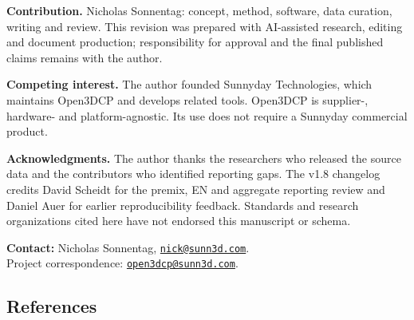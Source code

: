 \documentclass[
  american,
  11pt,
  letterpaper,
]{article}
\begin{document}
\textbf{Contribution.} Nicholas Sonnentag: concept, method, software,
data curation, writing and review. This revision was prepared with
AI-assisted research, editing and document production; responsibility
for approval and the final published claims remains with the author.

\textbf{Competing interest.} The author founded Sunnyday Technologies,
which maintains Open3DCP and develops related tools. Open3DCP is
supplier-, hardware- and platform-agnostic. Its use does not require a
Sunnyday commercial product.

\textbf{Acknowledgments.} The author thanks the researchers who released
the source data and the contributors who identified reporting gaps. The
v1.8 changelog credits David Scheidt for the premix, EN and aggregate
reporting review and Daniel Auer for earlier reproducibility feedback.
Standards and research organizations cited here have not endorsed this
manuscript or schema.

\textbf{Contact:} Nicholas Sonnentag,
\href{mailto:nick@sunn3d.com}{\nolinkurl{nick@sunn3d.com}}.\\
Project correspondence:
\href{mailto:open3dcp@sunn3d.com}{\nolinkurl{open3dcp@sunn3d.com}}.

\subsection{References}\label{references}

\begingroup{}
\end{document}
